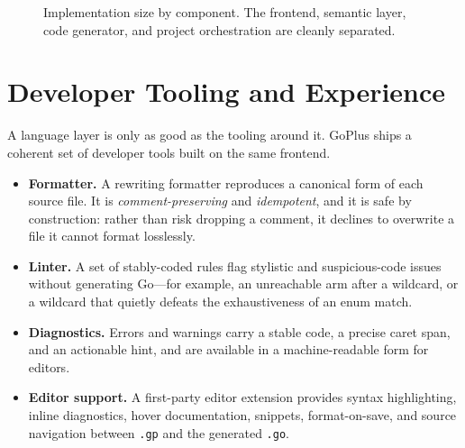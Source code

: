 \documentclass[11pt,a4paper]{article}
\begin{document}
\begin{figure}[ht]
\centering
{}
\caption{Implementation size by component. The frontend, semantic layer, code
generator, and project orchestration are cleanly separated.}
\label{fig:loc}
\end{figure}

\section{Developer Tooling and Experience}
A language layer is only as good as the tooling around it. GoPlus ships a
coherent set of developer tools built on the same frontend.

\begin{itemize}[leftmargin=1.4em,itemsep=0.25em]
  \item \textbf{Formatter.} A rewriting formatter reproduces a canonical form of
        each source file. It is \emph{comment-preserving} and \emph{idempotent},
        and it is safe by construction: rather than risk dropping a comment, it
        declines to overwrite a file it cannot format losslessly.
  \item \textbf{Linter.} A set of stably-coded rules flag stylistic and
        suspicious-code issues without generating Go---for example, an
        unreachable arm after a wildcard, or a wildcard that quietly defeats the
        exhaustiveness of an enum match.
  \item \textbf{Diagnostics.} Errors and warnings carry a stable code, a precise
        caret span, and an actionable hint, and are available in a
        machine-readable form for editors.
  \item \textbf{Editor support.} A first-party editor extension provides syntax
        highlighting, inline diagnostics, hover documentation, snippets,
        format-on-save, and source navigation between \texttt{.gp} and the
        generated \texttt{.go}.
\end{itemize}
\end{document}

